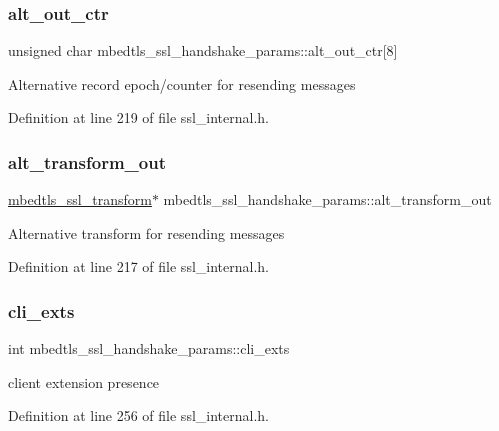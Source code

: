 \subsubsection{\texorpdfstring{alt\+\_\+out\+\_\+ctr}{alt\_out\_ctr}}
{\footnotesize\ttfamily unsigned char mbedtls\+\_\+ssl\+\_\+handshake\+\_\+params\+::alt\+\_\+out\+\_\+ctr\mbox{[}8\mbox{]}}

Alternative record epoch/counter for resending messages 

Definition at line 219 of file ssl\+\_\+internal.\+h.

\mbox{\label{structmbedtls__ssl__handshake__params_a398394cd035898f11b9e944bfb50186f}} 
\subsubsection{\texorpdfstring{alt\+\_\+transform\+\_\+out}{alt\_transform\_out}}
{\footnotesize\ttfamily \mbox{\hyperlink{structmbedtls__ssl__transform}{mbedtls\+\_\+ssl\+\_\+transform}}$\ast$ mbedtls\+\_\+ssl\+\_\+handshake\+\_\+params\+::alt\+\_\+transform\+\_\+out}

Alternative transform for resending messages 

Definition at line 217 of file ssl\+\_\+internal.\+h.

\mbox{\label{structmbedtls__ssl__handshake__params_a77de3ed4997da823dbeb52c02728fdc3}} 
\subsubsection{\texorpdfstring{cli\+\_\+exts}{cli\_exts}}
{\footnotesize\ttfamily int mbedtls\+\_\+ssl\+\_\+handshake\+\_\+params\+::cli\+\_\+exts}

client extension presence 

Definition at line 256 of file ssl\+\_\+internal.\+h.

